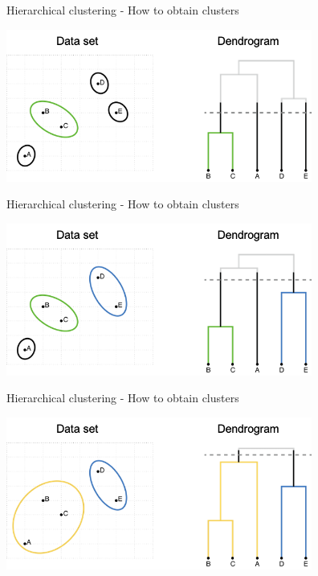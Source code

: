 \documentclass[notes]{beamer}          %
\begin{document}
\begin{frame}{Hierarchical clustering - How to obtain clusters}
\begin{center}
\includegraphics[height=5cm]{../figures/week_6/HierarchicalClustering_clusters_2.png}  
\end{center}
\end{frame}

\begin{frame}{Hierarchical clustering - How to obtain clusters}
\begin{center}
\includegraphics[height=5cm]{../figures/week_6/HierarchicalClustering_clusters_3.png}  
\end{center}
\end{frame}

\begin{frame}{Hierarchical clustering - How to obtain clusters}
\begin{center}
\includegraphics[height=5cm]{../figures/week_6/HierarchicalClustering_clusters_4.png}  
\end{center}
\end{frame}
\end{document}
